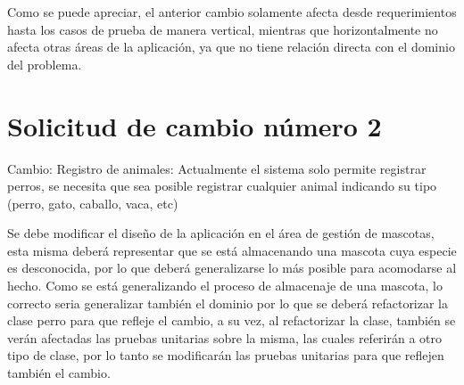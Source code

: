 Como se puede apreciar, el anterior cambio solamente afecta desde requerimientos hasta los casos de prueba de manera vertical, mientras que horizontalmente no afecta otras áreas de la aplicación, ya que no tiene relación directa con el dominio del problema.

\section{Solicitud de cambio número 2}

Cambio: Registro de animales: Actualmente el sistema solo permite registrar perros, se necesita que sea posible registrar cualquier animal indicando su tipo (perro, gato, caballo, vaca, etc)

Se debe modificar el diseño de la aplicación en el área de gestión de mascotas, esta misma deberá representar que se está almacenando una mascota cuya especie es desconocida, por lo que deberá generalizarse lo más posible para acomodarse al hecho. Como se está generalizando el proceso de almacenaje de una mascota, lo correcto seria generalizar también el dominio por lo que se deberá refactorizar la clase perro para que refleje el cambio, a su vez, al refactorizar la clase, también se verán afectadas las pruebas unitarias sobre la misma, las cuales referirán a otro tipo de clase, por lo tanto se modificarán las pruebas unitarias para que reflejen también el cambio.

